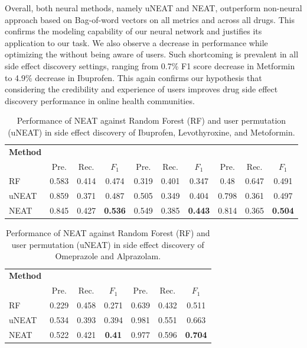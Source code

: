 \documentclass{bmcart}
\begin{document}
Overall, both neural methods, namely uNEAT and NEAT, outperform non-neural approach based on Bag-of-word vectors on all metrics and across all drugs. This confirms the modeling capability of our neural network and justifies its application to our task. We also observe a decrease in performance while optimizing the without being aware of users. Such shortcoming is prevalent in all side effect discovery settings, ranging from 0.7\% F1 score decrease in Metformin to 4.9\% decrease in Ibuprofen. This again confirms our hypothesis that considering the credibility and experience of users improves drug side effect discovery performance in online health communities.

\begin{table}[t!]
  \captionsetup{justification=centering}
  \centering
  \scalebox{1.2}
  \footnotesize
  \begin{tabular}{l||c|c|c|c|c|c|c|c|c}
    \hline
    \textbf{Method}& 
    \multicolumn{3}{c|}{\centering{Ibuprofen}} & \multicolumn{3}{c|}{\centering{Levothyroxine}} & \multicolumn{3}{c}{\centering{Metoformin}}\\
    & Pre. & Rec. & $F_1$ & Pre. & Rec. & $F_1$ & Pre. & Rec. & $F_1$ \\ \hline \hline
    RF & 0.583 & 0.414 & 0.474 & 0.319 & 0.401 & 0.347 & 0.48 & 0.647 & 0.491 \\ \hline
    uNEAT & 0.859 & 0.371 & 0.487 & 0.505 & 0.349 & 0.404 & 0.798 & 0.361 & 0.497 \\ \hline
    NEAT & 0.845 & 0.427 & \textbf{0.536} & 0.549 & 0.385 & \textbf{0.443} & 0.814 & 0.365 & \textbf{0.504} \\ \hline
  \end{tabular}
  \caption{Performance of NEAT against Random Forest (RF) and user permutation (uNEAT) in side effect discovery of Ibuprofen, Levothyroxine, and Metoformin.}\label{table:se_discovery1}
\end{table}

\begin{table}[t!]
  \captionsetup{justification=centering}
  \centering
  \scalebox{1.2}
  \footnotesize
  \begin{tabular}{l||c|c|c|c|c|c}
    \hline
    \textbf{Method} &
    \multicolumn{3}{c|}{\centering{Omeprazole}} &
    \multicolumn{3}{c}{\centering{Alprazolam}}\\
    & Pre. & Rec. & $F_1$ & Pre. & Rec. & $F_1$ \\ \hline \hline
    RF & 0.229 & 0.458 & 0.271 & 0.639 & 0.432 & 0.511 \\ \hline
    uNEAT & 0.534 & 0.393 & 0.394 & 0.981 & 0.551 & 0.663 \\ \hline
    NEAT & 0.522 & 0.421 & \textbf{0.41} & 0.977 & 0.596 & \textbf{0.704} \\ \hline
  \end{tabular}
  \caption{Performance of NEAT against Random Forest (RF) and user permutation (uNEAT) in side effect discovery of Omeprazole and Alprazolam.}\label{table:se_discovery2}
\end{table}
\end{document}
